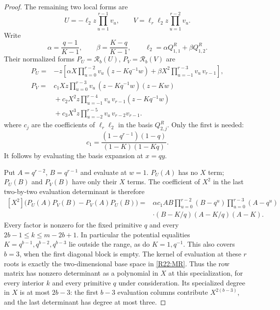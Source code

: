 \begin{proof}
The remaining two local forms are
\[
 U=-\ell_2z\prod_{u=1}^{r-1}v_u,\qquad
 V=\ell_r\ell_2z\prod_{u=1}^{r-2}v_u.
\]
Write
\[
 \alpha=\frac{q-1}{K-1},\qquad
 \beta=\frac{K-q}{K-1},\qquad
 \ell_2=\alpha Q^R_{1,1}+\beta Q^R_{1,2}.
\]
Their normalized forms $P_U=\mathcal R_b(U)$,
$P_V=\mathcal R_b(V)$ are
\begin{align*}
 P_U={}&-z\left[
  \alpha X\prod_{u=0}^{r-2}v_u\,(z-Kq^{-1}w)
 +\beta X^2\prod_{u=-1}^{r-3}v_u\,v_{r-1}\right],\\
 P_V={}&c_1Xz\prod_{u=0}^{r-3}v_u\,(z-Kq^{-1}w)(z-Kw)\\
 &{}+c_2X^2z\prod_{u=-1}^{r-4}v_u\,v_{r-1}(z-Kq^{-1}w)\\
 &{}+c_3X^3z\prod_{u=-2}^{r-5}v_u\,v_{r-2}v_{r-1}.
\end{align*}
where $c_j$ are the coefficients of $\ell_r\ell_2$ in the basis
$Q^R_{2,j}$. Only the first is needed:
\begin{equation}\label{R22:c1}
 c_1=\frac{(1-q^{r-1})(1-q)}{(1-K)(1-Kq)}.
\end{equation}
It follows by evaluating the basis expansion at $x=qy$.

Put $A=q^{r-2}$, $B=q^{r-1}$ and evaluate at $w=1$.
$P_U(A)$ has no $X$ term; $P_U(B)$ and $P_V(B)$ have only their
$X$ terms. The coefficient of $X^2$ in the last two-by-two
evaluation determinant is therefore
\begin{equation}\label{R22:last_minor}
 \begin{split}
 [X^2]\big(P_U(A)P_V(B)-P_V(A)P_U(B)\big)
 ={}&\alpha c_1AB
 \prod_{u=0}^{r-2}(B-q^u)
 \prod_{u=0}^{r-3}(A-q^u)\\
 &\cdot(B-K/q)(A-K/q)(A-K).
 \end{split}
\end{equation}
Every factor is nonzero for the fixed primitive $q$ and every
$2b-1\leq k\leq m-2b+1$. In particular the potential equalities
$K=q^{b-1},q^{b-2},q^{b-3}$ lie outside the range, as do $K=1,q^{-1}$.
This also covers $b=3$, when the first diagonal block is empty.
The kernel of evaluation at these $r$ roots is exactly the
two-dimensional base space in \eqref{R22:MR}. Thus the row matrix
has nonzero determinant as a polynomial in $X$ at this specialization,
for every interior $k$ and every primitive $q$ under consideration.
Its specialized degree in $X$ is at most $2b-3$: the first $b-3$
evaluation columns contribute $X^{2(b-3)}$, and the last determinant
has degree at most three.


\end{proof}
